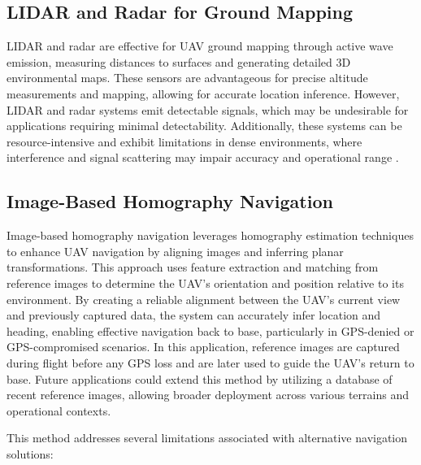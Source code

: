\subsection{LIDAR and Radar for Ground Mapping}

LIDAR and radar are effective for UAV ground mapping through active wave emission, measuring distances to surfaces and generating detailed 3D environmental maps. These sensors are advantageous for precise altitude measurements and mapping, allowing for accurate location inference. However, LIDAR and radar systems emit detectable signals, which may be undesirable for applications requiring minimal detectability. Additionally, these systems can be resource-intensive and exhibit limitations in dense environments, where interference and signal scattering may impair accuracy and operational range \cite{scoutaerial2024lidar}.

\subsection{Image-Based Homography Navigation}

Image-based homography navigation leverages homography estimation techniques to enhance UAV navigation by aligning images and inferring planar transformations. This approach uses feature extraction and matching from reference images to determine the UAV’s orientation and position relative to its environment. By creating a reliable alignment between the UAV’s current view and previously captured data, the system can accurately infer location and heading, enabling effective navigation back to base, particularly in GPS-denied or GPS-compromised scenarios. In this application, reference images are captured during flight before any GPS loss and are later used to guide the UAV’s return to base. Future applications could extend this method by utilizing a database of recent reference images, allowing broader deployment across various terrains and operational contexts.


This method addresses several limitations associated with alternative navigation solutions:

